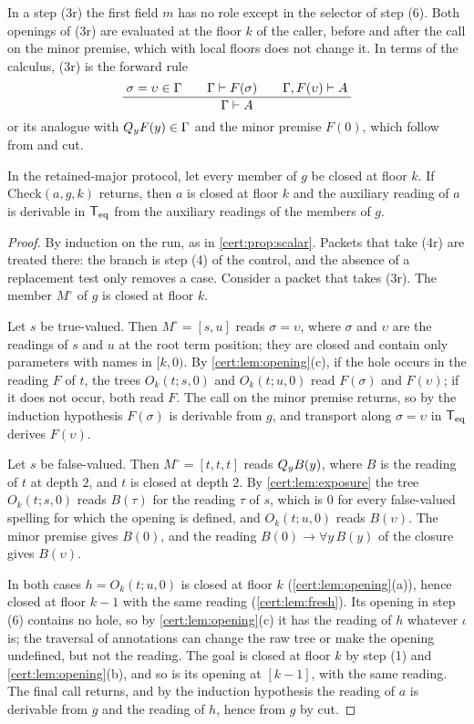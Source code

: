 In a step (3r) the first field $m$ has no role except in the selector of
step (6). Both openings of (3r) are evaluated at the floor $k$ of the caller,
before and after the call on the minor premise, which with local floors does
not change it. In terms of the calculus, (3r) is the forward rule
\[
\dfrac{\;\sigma=\upsilon\in\Gamma\qquad \Gamma\vdash F(\sigma)\qquad
\Gamma,F(\upsilon)\vdash A\;}{\;\Gamma\vdash A\;}
\]
or its analogue with $Q_{y}F(y)\in\Gamma$ and the minor premise $F(0)$, which
follow from  and cut.

\begin{theorem}\label{cert:thm:retained-sound}
In the retained-major protocol, let every member of $g$ be closed at floor
$k$. If $\mathrm{Check}(a,g,k)$ returns, then $a$ is closed at floor $k$ and
the auxiliary reading of $a$ is derivable in $\mathsf{T}_{\mathrm{eq}}$ from the auxiliary
readings of the members of $g$.
\end{theorem}
\begin{proof}
By induction on the run, as in \cref{cert:prop:scalar}. Packets that take
(4r) are treated there: the branch is step (4) of the control, and the absence
of a replacement test only removes a case. Consider a packet that takes (3r).
The member $M^{\circ}$ of $g$ is closed at floor $k$.

Let $s$ be true-valued. Then $M^{\circ}=[s,u]$ reads $\sigma=\upsilon$, where
$\sigma$ and $\upsilon$ are the readings of $s$ and $u$ at the root term
position; they are closed and contain only parameters with names in $[k,0)$.
By \cref{cert:lem:opening}(c), if the hole occurs in the reading $F$ of $t$,
the trees $O_k(t;s,0)$ and $O_k(t;u,0)$ read $F(\sigma)$ and $F(\upsilon)$;
if it does not occur, both read $F$. The call on the minor premise returns,
so by the induction hypothesis $F(\sigma)$ is derivable from $g$, and
transport along $\sigma=\upsilon$ in $\mathsf{T}_{\mathrm{eq}}$ derives $F(\upsilon)$.

Let $s$ be false-valued. Then $M^{\circ}=[t,t,t]$ reads $Q_{y}B(y)$, where
$B$ is the reading of $t$ at depth $2$, and $t$ is closed at depth $2$. By
\cref{cert:lem:exposure} the tree $O_k(t;s,0)$ reads $B(\tau)$ for the
reading $\tau$ of $s$, which is $0$ for every false-valued spelling for which
the opening is defined, and $O_k(t;u,0)$ reads $B(\upsilon)$. The minor
premise gives $B(0)$, and the reading $B(0)\to\forall y\,B(y)$ of the
closure gives $B(\upsilon)$.

In both cases $h=O_k(t;u,0)$ is closed at floor $k$
(\cref{cert:lem:opening}(a)), hence closed at floor $k-1$ with the same
reading (\cref{cert:lem:fresh}). Its opening in step (6) contains no hole,
so by \cref{cert:lem:opening}(c) it has the reading of $h$ whatever $\iota$
is; the traversal of annotations can change the raw tree or make the opening
undefined, but not the reading. The goal is closed at floor $k$ by step (1)
and \cref{cert:lem:opening}(b), and so is its opening at $[k-1]$, with the
same reading. The final call returns, and by the induction hypothesis the
reading of $a$ is derivable from $g$ and the reading of $h$, hence from $g$
by cut.
\end{proof}

